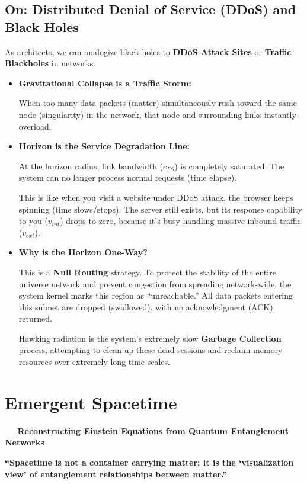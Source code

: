 \documentclass[11pt,a4paper,twoside]{book}
\begin{document}
\subsection{On: Distributed Denial of Service (DDoS) and Black Holes}

As architects, we can analogize black holes to \textbf{DDoS Attack Sites} or \textbf{Traffic Blackholes} in networks.

\begin{itemize}
\item \textbf{Gravitational Collapse is a Traffic Storm:}

    When too many data packets (matter) simultaneously rush toward the same node (singularity) in the network, that node and surrounding links instantly overload.

\item \textbf{Horizon is the Service Degradation Line:}

    At the horizon radius, link bandwidth (\textbf{$c_{FS}$}) is completely saturated. The system can no longer process normal requests (time elapse).

    This is like when you visit a website under DDoS attack, the browser keeps spinning (time slows/stops). The server still exists, but its response capability to you (\textbf{$v_{int}$}) drops to zero, because it's busy handling massive inbound traffic (\textbf{$v_{ext}$}).

\item \textbf{Why is the Horizon One-Way?}

    This is a \textbf{Null Routing} strategy. To protect the stability of the entire universe network and prevent congestion from spreading network-wide, the system kernel marks this region as ``unreachable.'' All data packets entering this subnet are dropped (swallowed), with no acknowledgment (ACK) returned.

    Hawking radiation is the system's extremely slow \textbf{Garbage Collection} process, attempting to clean up these dead sessions and reclaim memory resources over extremely long time scales.
\end{itemize}

 \section{Emergent Spacetime}

\textbf{--- Reconstructing Einstein Equations from Quantum Entanglement Networks}

\textbf{``Spacetime is not a container carrying matter; it is the `visualization view' of entanglement relationships between matter.''}
\end{document}

